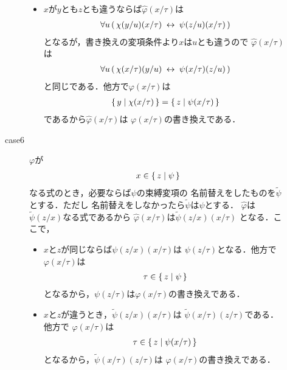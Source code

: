 \begin{metaprf}
\begin{description}
\begin{description}
\begin{itemize}
							\item $x$が$y$とも$z$とも違うならば$\widehat{\varphi}(x/\tau)$は
								\begin{align}
									\forall u\, (\, \chi(y/u)(x/\tau) \hspace{0.25em}\leftrightarrow\hspace{0.25em} \psi(z/u)(x/\tau)\, )
								\end{align}
								となるが，書き換えの変項条件より$x$は$u$とも違うので
								$\widehat{\varphi}(x/\tau)$は
								\begin{align}
									\forall u\, (\, \chi(x/\tau)(y/u) \hspace{0.25em}\leftrightarrow\hspace{0.25em} \psi(x/\tau)(z/u)\, )
								\end{align}
								と同じである．他方で$\varphi(x/\tau)$は
								\begin{align}
									\{\, y \mid \chi(x/\tau)\, \} = \{\, z \mid \psi(x/\tau)\, \}
								\end{align}
								であるから$\widehat{\varphi}(x/\tau)$は
								$\varphi(x/\tau)$の書き換えである．
						\end{itemize}
						
					\item[case6] $\varphi$が
						\begin{align}
							x \in \{\, z \mid \psi\, \}
						\end{align}
						なる式のとき，必要ならば$\psi$の束縛変項の
						名前替えをしたものを$\widetilde{\psi}$とする．ただし
						名前替えをしなかったら$\widetilde{\psi}$は$\psi$とする．
						$\widehat{\varphi}$は$\widetilde{\psi}(z/x)$なる式であるから
						$\widehat{\varphi}(x/\tau)$は$\tilde{\psi}(z/x)(x/\tau)$
						となる．ここで，
						\begin{itemize}
							\item $x$と$z$が同じならば$\psi(z/x)(x/\tau)$は
								$\psi(z/\tau)$となる．他方で$\varphi(x/\tau)$は
								\begin{align}
									\tau \in \{\, z \mid \psi\, \}
								\end{align}
								となるから，$\psi(z/\tau)$は$\varphi(x/\tau)$の書き換えである．
								
							\item $x$と$z$が違うとき，$\widetilde{\psi}(z/x)(x/\tau)$は
								$\widetilde{\psi}(x/\tau)(z/\tau)$である．他方で
								$\varphi(x/\tau)$は
								\begin{align}
									\tau \in \{\, z \mid \psi(x/\tau)\, \}
								\end{align}
								となるから，$\widetilde{\psi}(x/\tau)(z/\tau)$は
								$\varphi(x/\tau)$の書き換えである．
						\end{itemize}
						

\end{description}
\end{description}
\end{metaprf}
